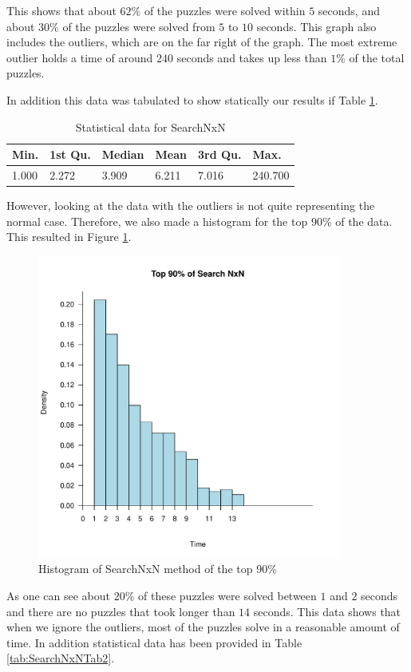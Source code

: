\documentclass[letterpaper]{article}
\begin{document}
This shows that about $62\%$ of the puzzles were solved within $5$ seconds, and about $30\%$ of the puzzles were solved from $5$ to $10$ seconds. This graph also includes the outliers, which are on the far right of the graph. The most extreme outlier holds a time of around $240$ seconds and takes up less than $1\%$ of the total puzzles.

In addition this data was tabulated to show statically our results if Table \ref{tab:SearchNxNTab1}.

\begin{table}[h]
\begin{tabular}{|l|l|l|l|l|l|}
\hline
Min. & 1st Qu.  & Median & Mean & 3rd Qu. & Max.\\
\hline
1.000 & 2.272 & 3.909 & 6.211 & 7.016 & 240.700\\
\hline
\end{tabular}
\caption{Statistical data for SearchNxN}
\label{tab:SearchNxNTab1}
\end{table}

However, looking at the data with the outliers is not quite representing the normal case. Therefore, we also made a histogram for the top $90\%$ of the data. This resulted in Figure \ref{fig:search-time-complex-hist-90}.

\begin{figure}[h]
	\centering
	\includegraphics[width=100mm]{../stats/Top90SearchNxN.pdf}
	\caption{Histogram of SearchNxN method of the top 90\%}
	\label{fig:search-time-complex-hist-90}
\end{figure}

As one can see about $20\%$ of these puzzles were solved between $1$ and $2$ seconds and there are no puzzles that took longer than $14$ seconds. This data shows that when we ignore the outliers, most of the puzzles solve in a reasonable amount of time. In addition statistical data has been provided in Table \ref{tab:SearchNxNTab2}.
\end{document}
